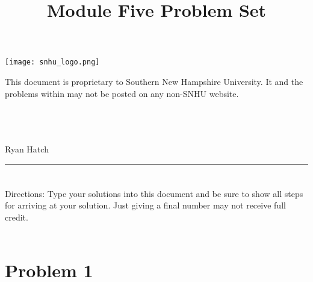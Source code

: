 \documentclass{amsart}
\theoremstyle{definition}
\theoremstyle{Exercise}
\theoremstyle{remark}
\theoremstyle{rule}
\numberwithin{equation}{section}
\begin{document}
\begin{center}
\texttt{[image: snhu\_logo.png]}
\end{center}
\title{\sf Module Five Problem Set}%


\maketitle
This document is proprietary to Southern New Hampshire University. It and the problems within may not be posted on any non-SNHU website.\\\\\\\\
\begin{center}
Ryan Hatch
\end{center}


\begin{center}
\rule{\textwidth}{0.4pt}
\end{center}


\newpage

\section*{}
\section*{}
Directions: Type your solutions into this document and be sure to show all steps for arriving at your solution. Just giving a final number may not receive full credit.
\\\\
\section*{Problem 1}
\end{document}
